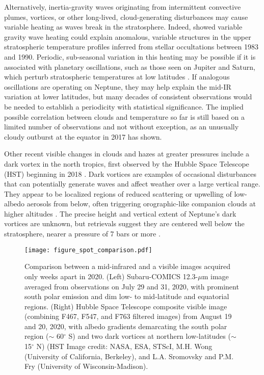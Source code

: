 \documentclass[twocolumn,10pt]{aastex631}
\begin{document}
Alternatively, inertia-gravity waves originating from intermittent convective plumes, vortices, or other long-lived, cloud-generating disturbances may cause variable heating as waves break in the stratosphere. Indeed, \citet{roques1994neptune} showed variable gravity wave heating could explain anomalous, variable structures in the upper stratospheric temperature profiles inferred from stellar occultations between 1983 and 1990.  Periodic, sub-seasonal variation in this heating may be possible if it is associated with planetary oscillations, such as those seen on Jupiter and Saturn, which perturb stratospheric temperatures at low latitudes \citep{leovy1991quasiquadrennial,friedson1999_QBO,orton2008saturnoscillations,fletcher2017saturndisruption,guerlet2018equatorial}. If analogous oscillations are operating on Neptune, they may help explain the mid-IR variation at lower latitudes, but many decades of consistent observations would be needed to establish a periodicity with statistical significance. The implied possible correlation between clouds and temperature so far is still based on a limited number of observations and not without exception, as an unusually cloudy outburst at the equator in 2017 \citep{molter2019neptune} has shown.  

Other recent visible changes in clouds and hazes at greater pressures include a dark vortex in the north tropics, first observed by the Hubble Space Telescope (HST) beginning in 2018 \citep{simon2019darkspot}. Dark vortices are examples of occasional disturbances that can potentially generate waves and affect weather over a large vertical range. They appear to be localized regions of reduced scattering or upwelling of low-albedo aerosols from below, often triggering orographic-like companion clouds at higher altitudes \citep[\textit{e.g.},][]{smith1989voyager, sromovsky1993dynamics,dePater2014neptune,huesoneptunelonglived2017}. The precise height and vertical extent of Neptune's dark vortices are unknown, but retrievals suggest they are centered well below the stratosphere, nearer a pressure of 7 bars or more \citep{irwin2022hazy}. %
\begin{figure}[h]
    \centering
    \texttt{[image: figure\_spot\_comparison.pdf]}
    \caption{Comparison between a mid-infrared and a visible images acquired only weeks apart in 2020. (Left) Subaru-COMICS 12.3-$\mu$m image averaged from observations on July 29 and 31, 2020, with prominent south polar emission and dim low- to mid-latitude and equatorial regions. (Right) Hubble Space Telescope composite visible image (combining F467, F547, and F763 filtered images) from August 19 and 20, 2020, with albedo gradients demarcating the south polar region ($\sim$ 60$^{\circ}$ S) and two dark vortices at northern low-latitudes  ($\sim$ 15$^{\circ}$ N) (HST Image credit: NASA, ESA, STScI, M.H. Wong (University of California, Berkeley), and L.A. Sromovsky and P.M. Fry (University of Wisconsin-Madison). }
    \label{fig:spot} 
\end{figure}
\end{document}
